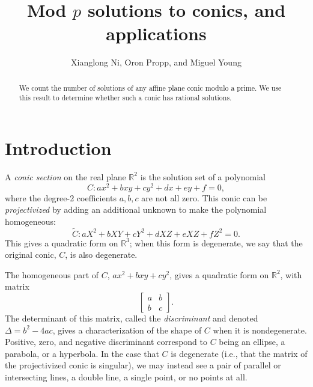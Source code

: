 \documentclass[10pt,a4paper]{amsart}
\numberwithin{equation}{section}
\numberwithin{figure}{section}
\theoremstyle{definition}
\theoremstyle{remark}
\theoremstyle{plain}
\theoremstyle{plain}
\theoremstyle{definition}
\theoremstyle{plain}
\theoremstyle{plain}
\newcommand{\R}{\mathbb{R}}
\begin{document}
 

\title{Mod $p$ solutions to conics, and applications} 
\author{Xianglong Ni, Oron Propp, and Miguel Young}
\maketitle

\begin{abstract} 
	We count the number of solutions of any affine plane conic modulo a prime.
	We use this result to determine whether such a conic has rational solutions. 
\end{abstract}

\tableofcontents

\section{Introduction}\label{sec:intro} 

	A \emph{conic section} on the real plane $\R^2$ is the solution set of 
	a polynomial
	\[ C: ax^2 + bxy + cy^2 + dx + ey + f = 0, \]
	where the degree-2 coefficients $a, b, c$ are not all zero. This conic can be \emph{projectivized} by adding an additional
	unknown to make the polynomial homogeneous:
	\[ \widetilde{C}: aX^2 + bXY + cY^2 + dXZ + eXZ + fZ^2 = 0. \]
	This gives a quadratic form on $\R^3$; when this form is degenerate, we
	say that the original conic, $C$, is also degenerate.
	
	The homogeneous part of $C$, $ax^2 + bxy + cy^2$, gives a quadratic form
	on $\R^2$, with matrix
	\[ \begin{bmatrix}
	a & b \\
	b & c
	\end{bmatrix}. \]
	The determinant of this matrix, called the \emph{discriminant} and
	denoted $\Delta = b^2 - 4ac$, gives a characterization of the shape of $C$
	when it is nondegenerate. Positive, zero, and negative discriminant
	correspond to $C$ being an ellipse, a parabola, or a hyperbola. In the
	case that $C$ is degenerate (i.e., that the matrix of the projectivized
	conic is singular), we may instead see a pair of parallel or intersecting 
	lines, a double line, a single point, or no points at all.
	
\end{document}
